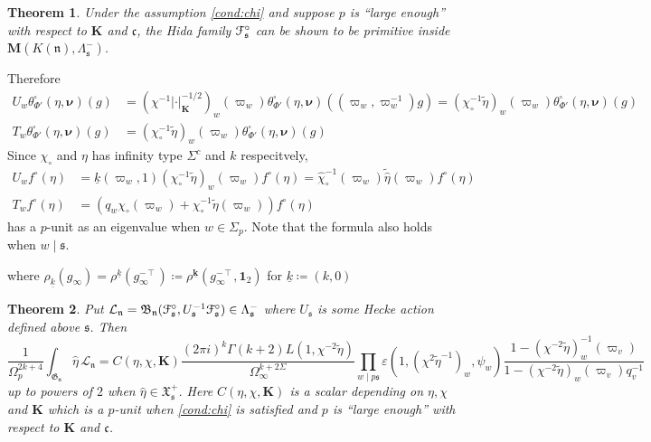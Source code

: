 \documentclass[leqno]{amsart}
\newcommand{\euF}{\EuScript{F}} %
\newcommand{\M}{\mathbf{M}} %
\newcommand{\bnu}{\boldsymbol{\nu}}
\newcommand{\wt}[1]{\underline{ #1 }}
\newcommand{\bwt}[1]{\underline{\boldsymbol { #1 }}}
\newcommand{\fG}{\mathfrak{G}}
\newcommand{\fX}{\mathfrak{X}}
\newcommand{\B}{\mathfrak B}
\newcommand{\id}{\mathbf{1}}
\newcommand{\K}{{\mathbf{K}}} %
\newcommand{\fc}{\mathfrak{c}}
\newcommand{\fs}{\mathfrak{s}}
\newcommand{\fn}{\mathfrak{n}}
\newtheorem{thm}{Theorem}[section]
\theoremstyle{definition}
\theoremstyle{remark}
\begin{document}
\begin{thm}\label{thm:intro1}
    Under the assumption \eqref{cond:chi}
    and suppose $p$ is ``large enough'' with respect to $\K$ and $\fc$,
    the Hida family $\euF^\circ_{\fs}$
    can be shown to be primitive inside $\M(K(\fn),\Lambda_{\fs}^-)$.
\end{thm}

Therefore
\begin{align*}
    U_w\theta^\square_{\Phi'}(\eta,\bnu)(g)&=
    (\chi^{-1}|\cdot|_\K^{-1/2})_w(\varpi_w)
    \theta^\square_{\Phi'}(\eta,\bnu)((\varpi_w,\varpi_w^{-1})g)
    =(\chi_\circ^{-1}\tilde{\eta})_w(\varpi_w)
    \theta^\square_{\Phi'}(\eta,\bnu)(g)\\
    T_w\theta^\square_{\Phi'}(\eta,\bnu)(g)&=
    (\chi_\circ^{-1}\tilde{\eta})_w(\varpi_w)
    \theta^\square_{\Phi'}(\eta,\bnu)(g)
\end{align*}
Since $\chi_\circ$ and $\eta$ has infinity type $\Sigma^c$ and $k$ respecitvely,
\begin{align}
    U_wf^\circ(\eta)&=
    \wt{k}(\varpi_w,1)
    (\chi_\circ^{-1}\tilde{\eta})_w(\varpi_w)f^\circ(\eta)=
    \hat{\chi}_\circ^{-1}(\varpi_w)\tilde{\hat{\eta}}(\varpi_w)f^\circ(\eta)\\
    T_wf^\circ(\eta)&=
    (q_w\chi_\circ(\varpi_w)
    +\chi_\circ^{-1}\tilde{\eta}(\varpi_w))
    f^\circ(\eta)
\end{align}
has a $p$-unit as an eigenvalue when $w\in \Sigma_p$.
Note that the formula also holds when $w\mid \fs$.


where $\rho_{\wt{k}}(g_\infty)=\rho^{\wt{k}}(g_\infty^{-\intercal})
\coloneqq \rho^{\bwt{k}}(g_\infty^{-\intercal},\id_2)$
for $\wt{k}\coloneqq (k,0)$



\begin{thm}\label{thm:intro2}
    Put $\mathcal{L}_\fn=\B_\fn(\euF^\circ_{\fs},U_\fs^{-1}\euF^\circ_{\fs})
    \in \Lambda_{\fs}^-$
    where $U_\fs$ is some Hecke action defined above $\fs$. Then
    \begin{equation*}
        \frac{1}{\Omega_p^{2k+4}}
        \int_{\fG_{\fn}}\hat{\eta}\,\mathcal{L}_\fn=
    C(\eta,\chi,\K)
    \frac{(2\pi i)^{k}\Gamma(k+2)L(1,\chi^{-2}\tilde{\eta})}{\Omega_\infty^{k+2\Sigma}}
    \prod_{w\mid p\fs}
    \varepsilon(1,(\chi^{2}\tilde{\eta}^{-1})_w,\psi_w)
    \frac{1-(\chi^{-2}\tilde{\eta})^{-1}_w(\varpi_v)}
    {1-(\chi^{-2}\tilde{\eta})_w(\varpi_v)q_v^{-1}}
    \end{equation*}
    up to powers of $2$
    when $\hat{\eta}\in \fX^+_{\fs}$.
    Here $C(\eta,\chi,\K)$ is a scalar depending on $\eta,\chi$ and $\K$
    which is a $p$-unit when \eqref{cond:chi} is satisfied 
    and $p$ is ``large enough''
    with respect to $\K$ and $\fc$. 
\end{thm}
\end{document}
